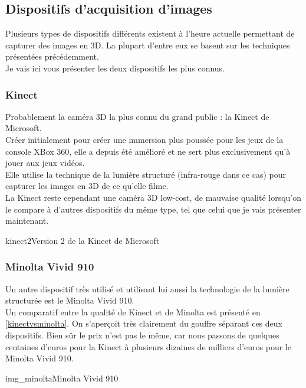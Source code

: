 \documentclass[overfullbox, poster]{polytech/polytech}
\begin{document}
\subsection{Dispositifs d'acquisition d'images}
\label{dispositif_acquisiton}
Plusieurs types de dispositifs différents existent à l'heure actuelle permettant de capturer des images en 3D. La plupart d'entre eux se basent sur les techniques présentées précédemment.\\
Je vais ici vous présenter les deux dispositifs les plus connus.

\subsubsection{Kinect}
\label{kinect}
Probablement la caméra 3D la plus connu du grand public : la Kinect de Microsoft.\\
Créer initialement pour créer une immersion plus poussée pour les jeux de la console XBox 360, elle a depuis été amélioré et ne sert plus exclusivement qu'à jouer aux jeux vidéos.\\
Elle utilise la technique de la lumière structuré (infra-rouge dans ce cas) pour capturer les images en 3D de ce qu'elle filme.\\
La Kinect reste cependant une caméra 3D low-cost, de mauvaise qualité lorsqu'on le compare à d'autres dispositifs du même type, tel que celui que je vais présenter maintenant.

\begin{Figure}{kinect2}{Version 2 de la Kinect de Microsoft}
\end{Figure}

\subsubsection{Minolta Vivid 910}
\label{minolta}
Un autre dispositif très utilisé et utilisant lui aussi la technologie de la lumière structurée est le Minolta Vivid 910.\\
Un comparatif entre la qualité de Kinect et de Minolta est présenté en \autoref{kinectvsminolta}. On s'aperçoit très clairement du gouffre séparant ces deux dispositifs. Bien sûr le prix n'est pas le même, car nous passons de quelques centaines d'euros pour la Kinect à plusieurs dizaines de milliers d'euros pour le Minolta Vivid 910.

\begin{Figure}{img_minolta}{Minolta Vivid 910}
\end{Figure}
\end{document}
